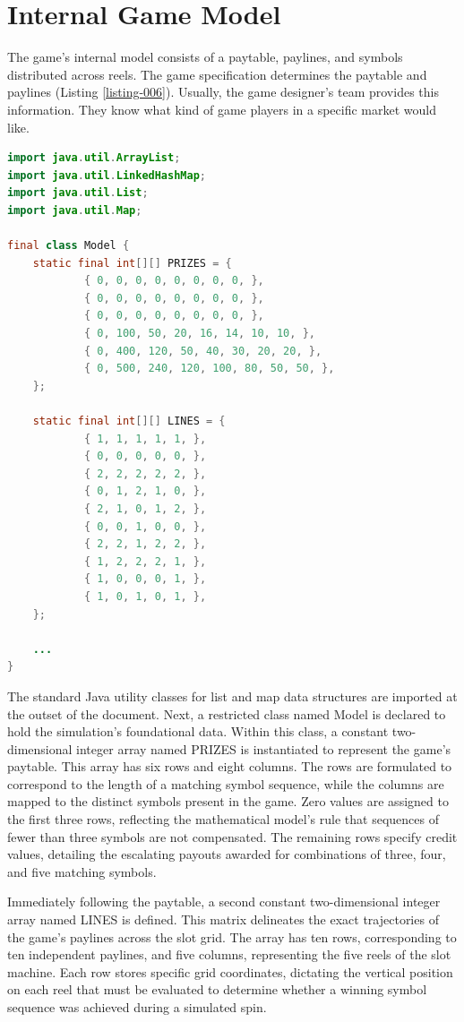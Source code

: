\documentclass[12pt,twoside,openany]{book}
\begin{document}
\section{Internal Game Model}

The game's internal model consists of a paytable, paylines, and symbols distributed across reels. The game specification determines the paytable and paylines (Listing \ref{listing-006}). Usually, the game designer's team provides this information. They know what kind of game players in a specific market would like.

\begin{lstlisting}[language=Java, caption={Predetermined values}, label=listing-006]
import java.util.ArrayList;
import java.util.LinkedHashMap;
import java.util.List;
import java.util.Map;

final class Model {
	static final int[][] PRIZES = {
			{ 0, 0, 0, 0, 0, 0, 0, 0, },
			{ 0, 0, 0, 0, 0, 0, 0, 0, },
			{ 0, 0, 0, 0, 0, 0, 0, 0, },
			{ 0, 100, 50, 20, 16, 14, 10, 10, },
			{ 0, 400, 120, 50, 40, 30, 20, 20, },
			{ 0, 500, 240, 120, 100, 80, 50, 50, },
	};

	static final int[][] LINES = {
			{ 1, 1, 1, 1, 1, },
			{ 0, 0, 0, 0, 0, },
			{ 2, 2, 2, 2, 2, },
			{ 0, 1, 2, 1, 0, },
			{ 2, 1, 0, 1, 2, },
			{ 0, 0, 1, 0, 0, },
			{ 2, 2, 1, 2, 2, },
			{ 1, 2, 2, 2, 1, },
			{ 1, 0, 0, 0, 1, },
			{ 1, 0, 1, 0, 1, },
	};

	...
}
\end{lstlisting}

The standard Java utility classes for list and map data structures are imported at the outset of the document. Next, a restricted class named Model is declared to hold the simulation's foundational data. Within this class, a constant two-dimensional integer array named PRIZES is instantiated to represent the game's paytable. This array has six rows and eight columns. The rows are formulated to correspond to the length of a matching symbol sequence, while the columns are mapped to the distinct symbols present in the game. Zero values are assigned to the first three rows, reflecting the mathematical model's rule that sequences of fewer than three symbols are not compensated. The remaining rows specify credit values, detailing the escalating payouts awarded for combinations of three, four, and five matching symbols.

Immediately following the paytable, a second constant two-dimensional integer array named LINES is defined. This matrix delineates the exact trajectories of the game's paylines across the slot grid. The array has ten rows, corresponding to ten independent paylines, and five columns, representing the five reels of the slot machine. Each row stores specific grid coordinates, dictating the vertical position on each reel that must be evaluated to determine whether a winning symbol sequence was achieved during a simulated spin.
\end{document}
